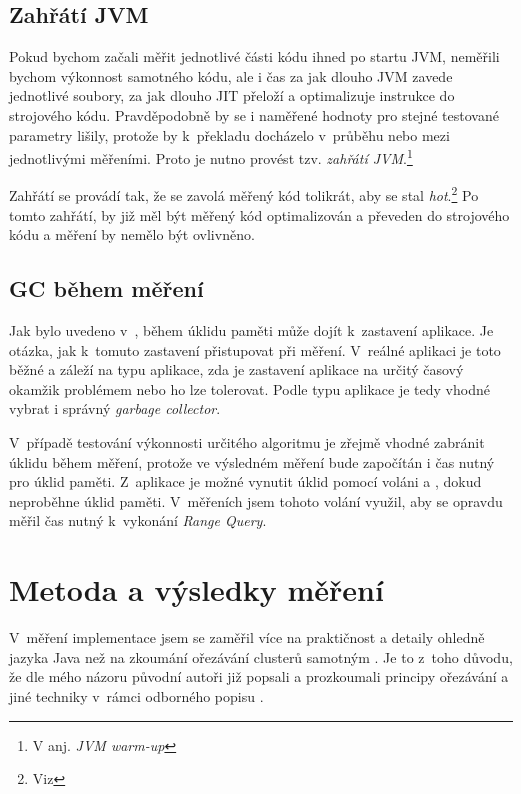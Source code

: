 \subsection{Zahřátí JVM}

Pokud bychom začali měřit jednotlivé části kódu ihned po startu JVM, neměřili bychom výkonnost samotného kódu, ale i čas za jak dlouho JVM zavede jednotlivé \classfile soubory, za jak dlouho JIT přeloží a optimalizuje instrukce \bytecode{} do strojového kódu.
Pravděpodobně by se i naměřené hodnoty pro stejné testované parametry lišily, protože by k~překladu docházelo v~průběhu nebo mezi jednotlivými měřeními.
Proto je nutno provést tzv. \emph{zahřátí JVM}.\footnote{V anj. \emph{JVM warm-up}}

Zahřátí se provádí tak, že se zavolá měřený kód tolikrát, aby se stal \emph{hot}.\footnote{Viz }
Po tomto zahřátí, by již měl být měřený kód optimalizován a převeden do strojového kódu a měření by nemělo být ovlivněno.

\subsection{GC během měření}
Jak bylo uvedeno v~, během úklidu paměti může dojít k~zastavení aplikace.
Je otázka, jak k~tomuto zastavení přistupovat při měření.
V~reálné aplikaci je toto běžné a záleží na typu aplikace, zda je zastavení aplikace na určitý časový okamžik problémem nebo ho lze tolerovat.
Podle typu aplikace je tedy vhodné vybrat i správný \emph{garbage collector}.

V~případě testování výkonnosti určitého algoritmu je zřejmě vhodné zabránit úklidu během měření, protože ve výsledném měření bude započítán i čas nutný pro úklid paměti.
Z~aplikace je možné vynutit úklid pomocí voláni  a , dokud neproběhne úklid paměti.
V~měřeních jsem tohoto volání využil, aby se opravdu měřil čas nutný k~vykonání \emph{Range Query}.

\section{Metoda a výsledky měření}
V~měření implementace  jsem se zaměřil více na praktičnost a detaily ohledně jazyka Java než na zkoumání ořezávání clusterů samotným .
Je to z~toho důvodu, že dle mého názoru původní autoři již popsali a prozkoumali principy ořezávání a jiné techniky v~rámci odborného popisu .
 
